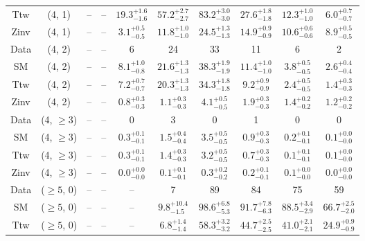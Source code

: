 \begin{table}[h!]
{\begin{tabular}{cccccccccc}
	Ttw & (4, 1) & -- & -- & $19.3^{+ 1.6 }_{- 1.6 }$ & $57.2^{+ 2.7 }_{- 2.7 }$ & $83.2^{+ 3.0 }_{- 3.0 }$ & $27.6^{+ 1.8 }_{- 1.8 }$ & $12.3^{+ 1.0 }_{- 1.0 }$ & $6.0^{+ 0.7 }_{- 0.7 }$ \\[0.5ex] 
	Zinv & (4, 1) & -- & -- & $3.1^{+ 0.5 }_{- 0.5 }$ & $11.8^{+ 1.0 }_{- 1.0 }$ & $24.5^{+ 1.3 }_{- 1.3 }$ & $14.9^{+ 0.9 }_{- 0.9 }$ & $10.6^{+ 0.6 }_{- 0.6 }$ & $8.9^{+ 0.5 }_{- 0.5 }$ \\[0.5ex] 
	Data & (4, 2) & -- & -- & 6 & 24 & 33 & 11 & 6 & 2 \\[0.5ex] 
	SM & (4, 2) & -- & -- & $8.1^{+ 1.0 }_{- 0.8 }$ & $21.6^{+ 1.3 }_{- 1.3 }$ & $38.3^{+ 1.9 }_{- 1.9 }$ & $11.4^{+ 1.0 }_{- 1.0 }$ & $3.8^{+ 0.5 }_{- 0.5 }$ & $2.6^{+ 0.4 }_{- 0.4 }$ \\[0.5ex] 
	Ttw & (4, 2) & -- & -- & $7.2^{+ 0.7 }_{- 0.7 }$ & $20.3^{+ 1.3 }_{- 1.3 }$ & $34.3^{+ 1.8 }_{- 1.8 }$ & $9.2^{+ 0.9 }_{- 0.9 }$ & $2.4^{+ 0.5 }_{- 0.5 }$ & $1.4^{+ 0.3 }_{- 0.3 }$ \\[0.5ex] 
	Zinv & (4, 2) & -- & -- & $0.8^{+ 0.3 }_{- 0.3 }$ & $1.1^{+ 0.3 }_{- 0.3 }$ & $4.1^{+ 0.5 }_{- 0.5 }$ & $1.9^{+ 0.3 }_{- 0.3 }$ & $1.4^{+ 0.2 }_{- 0.2 }$ & $1.2^{+ 0.2 }_{- 0.2 }$ \\[0.5ex] 
	Data & (4, $\ge3$) & -- & -- & 0 & 3 & 0 & 1 & 0 & 0 \\[0.5ex] 
	SM & (4, $\ge3$) & -- & -- & $0.3^{+ 0.1 }_{- 0.1 }$ & $1.5^{+ 0.4 }_{- 0.4 }$ & $3.5^{+ 0.5 }_{- 0.5 }$ & $0.9^{+ 0.3 }_{- 0.3 }$ & $0.2^{+ 0.1 }_{- 0.1 }$ & $0.1^{+ 0.0 }_{- 0.0 }$ \\[0.5ex] 
	Ttw & (4, $\ge3$) & -- & -- & $0.3^{+ 0.1 }_{- 0.1 }$ & $1.4^{+ 0.3 }_{- 0.3 }$ & $3.2^{+ 0.5 }_{- 0.5 }$ & $0.7^{+ 0.3 }_{- 0.3 }$ & $0.1^{+ 0.1 }_{- 0.1 }$ & $0.1^{+ 0.0 }_{- 0.0 }$ \\[0.5ex] 
	Zinv & (4, $\ge3$) & -- & -- & $0.0^{+ 0.0 }_{- 0.0 }$ & $0.1^{+ 0.1 }_{- 0.1 }$ & $0.3^{+ 0.2 }_{- 0.2 }$ & $0.2^{+ 0.1 }_{- 0.1 }$ & $0.1^{+ 0.0 }_{- 0.0 }$ & $0.0^{+ 0.0 }_{- 0.0 }$ \\[0.5ex] 
	Data & ($\ge5$, 0) & -- & -- & -- & 7 & 89 & 84 & 75 & 59 \\[0.5ex] 
	SM & ($\ge5$, 0) & -- & -- & -- & $9.8^{+ 10.4 }_{- 1.5 }$ & $98.6^{+ 6.8 }_{- 5.3 }$ & $91.7^{+ 7.8 }_{- 6.3 }$ & $88.5^{+ 3.4 }_{- 2.9 }$ & $66.7^{+ 2.5 }_{- 2.0 }$ \\[0.5ex] 
	Ttw & ($\ge5$, 0) & -- & -- & -- & $6.8^{+ 1.4 }_{- 1.4 }$ & $58.3^{+ 3.2 }_{- 3.2 }$ & $44.7^{+ 2.5 }_{- 2.5 }$ & $41.0^{+ 2.1 }_{- 2.1 }$ & $24.9^{+ 0.9 }_{- 0.9 }$ \\[0.5ex] 

\end{tabular}}
\end{table}
